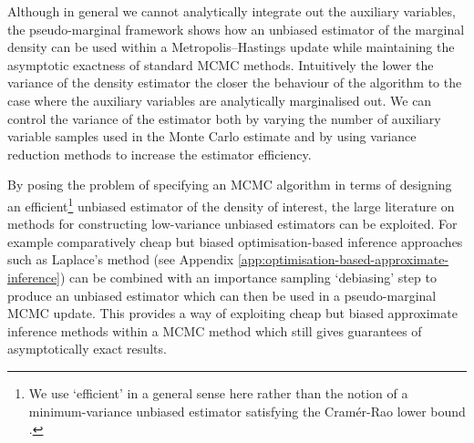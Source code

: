 Although in general we cannot analytically integrate out the auxiliary variables, the pseudo-marginal framework shows how an unbiased estimator of the marginal density can be used within a Metropolis--Hastings update while maintaining the asymptotic exactness of standard \ac{MCMC} methods.  Intuitively the lower the variance of the density estimator the closer the behaviour of the algorithm to the case where the auxiliary variables are analytically marginalised out. We can control the variance of the estimator both by varying the number of auxiliary variable samples used in the Monte Carlo estimate and by using variance reduction methods to increase the estimator efficiency.



By posing the problem of specifying an \ac{MCMC} algorithm in terms of designing an efficient\footnote{We use `efficient' in a general sense here rather than the notion of a minimum-variance unbiased estimator satisfying the Cram\'{e}r-Rao lower bound \citep{rao1992information,cramer2016mathematical}.} unbiased estimator of the density of interest, the large literature on methods for constructing low-variance unbiased estimators can be exploited. For example comparatively cheap but biased optimisation-based inference approaches such as Laplace's method (see Appendix \ref{app:optimisation-based-approximate-inference}) can be combined with an importance sampling `debiasing' step to produce an unbiased estimator which can then be used in a pseudo-marginal \ac{MCMC} update. This provides a way of exploiting cheap but biased approximate inference methods within a \ac{MCMC} method which still gives guarantees of asymptotically exact results.

